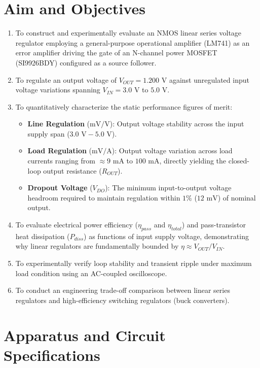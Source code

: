 \documentclass[11pt,a4paper]{article}
\begin{document}
\section{Aim and Objectives}
\begin{enumerate}
    \item To construct and experimentally evaluate an NMOS linear series voltage regulator employing a general-purpose operational amplifier (LM741) as an error amplifier driving the gate of an N-channel power MOSFET (SI9926BDY) configured as a source follower.
    \item To regulate an output voltage of $V_{OUT} = 1.200\text{ V}$ against unregulated input voltage variations spanning $V_{IN} = 3.0\text{ V}$ to $5.0\text{ V}$.
    \item To quantitatively characterize the static performance figures of merit:
    \begin{itemize}
        \item \textbf{Line Regulation} ($\text{mV/V}$): Output voltage stability across the input supply span ($3.0\text{ V} - 5.0\text{ V}$).
        \item \textbf{Load Regulation} ($\text{mV/A}$): Output voltage variation across load currents ranging from $\approx 9\text{ mA}$ to $100\text{ mA}$, directly yielding the closed-loop output resistance ($R_{OUT}$).
        \item \textbf{Dropout Voltage} ($V_{DO}$): The minimum input-to-output voltage headroom required to maintain regulation within $1\%$ ($12\text{ mV}$) of nominal output.
    \end{itemize}
    \item To evaluate electrical power efficiency ($\eta_{pass}$ and $\eta_{total}$) and pass-transistor heat dissipation ($P_{diss}$) as functions of input supply voltage, demonstrating why linear regulators are fundamentally bounded by $\eta \approx V_{OUT} / V_{IN}$.
    \item To experimentally verify loop stability and transient ripple under maximum load condition using an AC-coupled oscilloscope.
    \item To conduct an engineering trade-off comparison between linear series regulators and high-efficiency switching regulators (buck converters).
\end{enumerate}

\section{Apparatus and Circuit Specifications}
\end{document}

